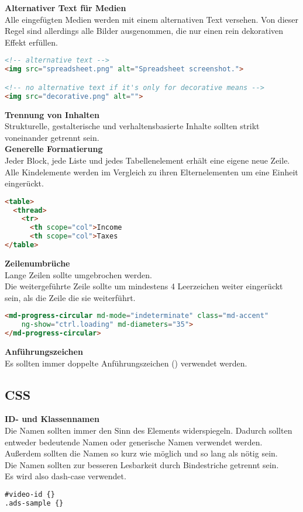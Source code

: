\textbf{Alternativer Text für Medien}\\
Alle eingefügten Medien werden mit einem alternativen Text versehen. Von dieser Regel sind allerdings alle Bilder ausgenommen, die nur einen rein dekorativen Effekt erfüllen.
\begin{lstlisting}[language = HTML, caption = Alternativtext, label = alttext]
<!-- alternative text -->
<img src="spreadsheet.png" alt="Spreadsheet screenshot.">

<!-- no alternative text if it's only for decorative means -->
<img src="decorative.png" alt="">
\end{lstlisting}

\textbf{Trennung von Inhalten}\\
Strukturelle, gestalterische und verhaltensbasierte Inhalte sollten strikt voneinander getrennt sein.\\

\textbf{Generelle Formatierung}\\
Jeder Block, jede Liste und jedes Tabellenelement erhält eine eigene neue Zeile.\\
Alle Kindelemente werden im Vergleich zu ihren Elternelementen um eine Einheit eingerückt.
\begin{lstlisting}[language = HTML, caption = Generelle Formatierung von HTML Dokumenten, label = formatting]
<table>
  <thread>
  	<tr>
  	  <th scope="col">Income
  	  <th scope="col">Taxes
</table>
\end{lstlisting}

\textbf{Zeilenumbrüche}\\
Lange Zeilen sollte umgebrochen werden.\\
Die weitergeführte Zeile sollte um mindestens 4 Leerzeichen weiter eingerückt sein, als die Zeile die sie weiterführt.
\begin{lstlisting}[language = HTML, caption = Zeilenumbrüche, label = line-wrapping]
<md-progress-circular md-mode="indeterminate" class="md-accent"
	ng-show="ctrl.loading" md-diameters="35">
</md-progress-circular>
\end{lstlisting}

\textbf{Anführungszeichen}\\
Es sollten immer doppelte Anführungszeichen (\grqq \grqq) verwendet werden.\\

\subsection{CSS}
\textbf{ID- und Klassennamen}\\
Die Namen sollten immer den Sinn des Elements widerspiegeln. Dadurch sollten entweder bedeutende Namen oder generische Namen verwendet werden.\\ 
Außerdem sollten die Namen so kurz wie möglich und so lang als nötig sein.\\
Die Namen sollten zur besseren Lesbarkeit durch Bindestriche getrennt sein. \\
Es wird also dash-case verwendet.
\begin{lstlisting}[language = HTML, caption = ID- und Klassennamen, label = doctype]
#video-id {}
.ads-sample {}
\end{lstlisting}

